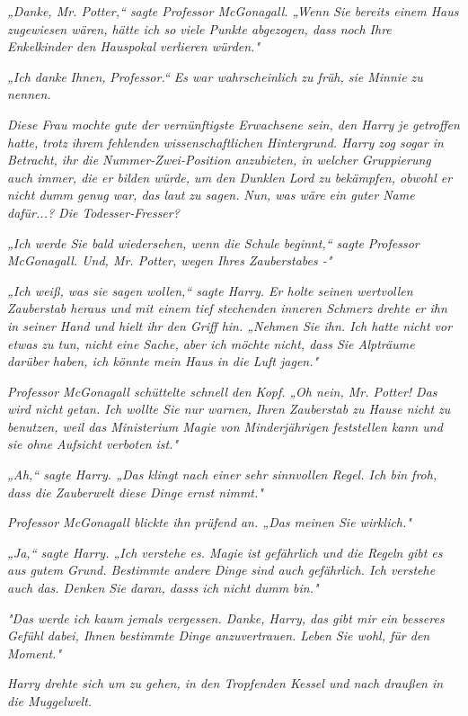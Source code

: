 {\emph{„Danke, Mr. Potter,“ sagte Professor McGonagall. „Wenn Sie bereits einem Haus zugewiesen wären, hätte ich so viele Punkte abgezogen, dass noch Ihre Enkelkinder den Hauspokal verlieren würden."}

\emph{„Ich danke} \emph{\emph{Ihnen,}} \emph{Professor.“ Es war wahrscheinlich zu früh, sie Minnie zu nennen.}

\emph{Diese Frau mochte gute der vernünftigste Erwachsene sein, den Harry je getroffen hatte, trotz ihrem fehlenden wissenschaftlichen Hintergrund. Harry zog sogar in Betracht, ihr die Nummer-Zwei-Position anzubieten, in welcher Gruppierung auch immer, die er bilden würde, um den Dunklen Lord zu bekämpfen, obwohl er nicht dumm genug war, das laut zu sagen.} \emph{\emph{Nun, was wäre ein guter Name dafür...? Die Todesser-Fresser?}}

\emph{„Ich werde Sie bald wiedersehen, wenn die Schule beginnt,“ sagte} \emph{Professor McGonagall. Und, Mr. Potter, wegen Ihres Zauberstabes -"}

\emph{„Ich weiß, was sie sagen wollen,“ sagte Harry. Er holte seinen wertvollen Zauberstab heraus und mit einem tief stechenden inneren Schmerz drehte er ihn in seiner Hand und hielt ihr den Griff hin. „Nehmen Sie ihn. Ich hatte nicht vor etwas zu tun, nicht eine Sache, aber ich möchte nicht, dass Sie Alpträume darüber haben, ich könnte mein Haus in die Luft jagen."}

\emph{Professor McGonagall schüttelte schnell den Kopf. „Oh nein, Mr. Potter! Das wird nicht getan. Ich wollte Sie nur warnen, Ihren Zauberstab zu Hause nicht zu benutzen, weil das Ministerium Magie von Minderjährigen feststellen kann und sie ohne Aufsicht verboten ist."}

\emph{„Ah,“ sagte Harry. „Das klingt nach einer sehr sinnvollen Regel. Ich bin froh, dass die Zauberwelt diese Dinge ernst nimmt."}

\emph{Professor McGonagall blickte ihn prüfend an. „Das meinen Sie wirklich."}

\emph{„Ja,“ sagte Harry. „Ich verstehe es. Magie ist gefährlich und die Regeln gibt es aus gutem Grund. Bestimmte andere Dinge sind auch gefährlich. Ich verstehe auch das. Denken Sie daran, dasss ich nicht dumm bin."}

\emph{"Das werde ich kaum jemals vergessen. Danke, Harry, das gibt mir ein besseres Gefühl dabei, Ihnen bestimmte Dinge anzuvertrauen. Leben Sie wohl, für den Moment."}

\emph{Harry drehte sich um zu gehen, in den Tropfenden Kessel und nach draußen in die Muggelwelt.}

}
